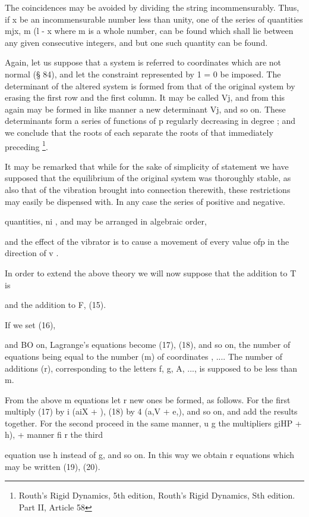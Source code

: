 The coincidences may be avoided by dividing the string incommensurably.
Thus, if x be an incommensurable number less than unity, one of the
series of quantities mjx, m (l - x where m is a whole number, can be
found which shall lie between any given consecutive integers, and but
one such quantity can be found.

Again, let us suppose that a system is referred to coordinates which
are not normal (§ 84), and let the constraint represented by 1 = 0 be
imposed. The determinant of the altered system is formed from that of
the original system by erasing the first row and the first column. It
may be called Vj, and from this again may be formed in like manner a
new determinant Vj, and so on.  These determinants form a series of
functions of p regularly decreasing in degree ; and we conclude that
the roots of each separate the roots of that immediately preceding
\footnote{Routh's Rigid Dynamics, 5th edition, Routh’s Rigid Dynamics,
Sth edition. Part II, Article 58}.

It may be remarked that while for the sake of simplicity of statement
we have supposed that the equilibrium of the original system was
thoroughly stable, as also that of the vibration brought into
connection therewith, these restrictions may easily be dispensed with.
In any case the series of positive and negative.

quantities, ni , and may be arranged in algebraic order,

and the effect of the vibrator is to cause a movement of every value
ofp in the direction of v .

In order to extend the above theory we will now suppose that the
addition to T is

and the addition to F, (15).

If we set (16),

and BO on, Lagrange’s equations become (17), (18),
and so on, the number of equations being equal to the number (m) of
coordinates ,  .... The number of additions (r), corresponding to the
letters f, g, A, ..., is supposed to be less than m.

From the above m equations let r new ones be formed, as follows. For
the first multiply (17) by i (aiX +   ), (18) by 4 (a,V + e,), and so
on, and add the results together. For the second proceed in the same
manner, u g the multipliers giHP +  h), +  manner fi r the third

equation use h instead of g, and so on. In this way we obtain r
equations which may be written (19), (20).

